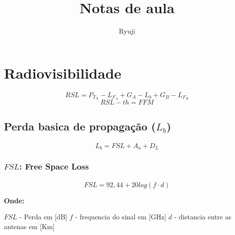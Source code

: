 \documentclass[11pt]{article} %
\title{Notas de aula}
\author{Ryuji}
\begin{document}
\maketitle
\newpage

\tableofcontents
\newpage


\section{Radiovisibilidade}

\paragraph{}

\begin{equation}
RSL = P_{T_{X}} - L_{F_{A}} + G_{A} - L_{b} + G_{B} - L_{F_{B}}
\end{equation}
\begin{equation}
RSL -th = FFM
\end{equation}

\subsection{Perda basica de propagação ($L_b$)}

\paragraph{}

\begin{equation}
L_{b} = FSL + A_{a} + D_{L}
\end{equation}

\subsubsection{$FSL$: Free Space Loss}

\paragraph{}

\begin{equation}
FSL = 92,44 + 20log(f \cdot d)
\end{equation}

\textbf{Onde:}

$FSL$ - Perda em [dB] \newline
$f$ - frequencia do sinal em [GHz] \newline
$d$ - distancia entre as antenas em [Km]
\end{document}
